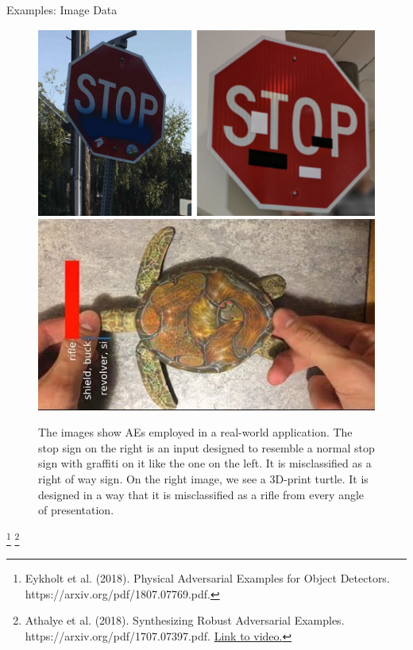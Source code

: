 \documentclass[11pt,compress,t,notes=noshow, aspectratio=169, xcolor=table]{beamer}
\begin{document}
\begin{vbframe}{Examples: Image Data}
\begin{figure}[h]
\centering
\includegraphics[width=0.46\linewidth]{figure/AEstop.png}\quad \includegraphics[width=0.45\linewidth]{figure/AEturtle.jpg}
  \caption{The images show AEs employed in a real-world application. The stop sign on the right is an input designed to resemble a normal stop sign with graffiti on it like the one on the left. It is misclassified as a right of way sign. On the right image, we see a 3D-print turtle. It is designed in a way that it is misclassified as a rifle from every angle of presentation.} 
  \label{fig:mnist}
\end{figure} 

\footnote[frame]{Eykholt et al. (2018). Physical Adversarial Examples for Object Detectors. https://arxiv.org/pdf/1807.07769.pdf.} 
\footnote[frame]{Athalye et al. (2018). Synthesizing Robust Adversarial Examples. https://arxiv.org/pdf/1707.07397.pdf. \href{https://www.youtube.com/watch?v=piYnd_wYlT8}{Link to video.}}

\end{vbframe}
\end{document}
